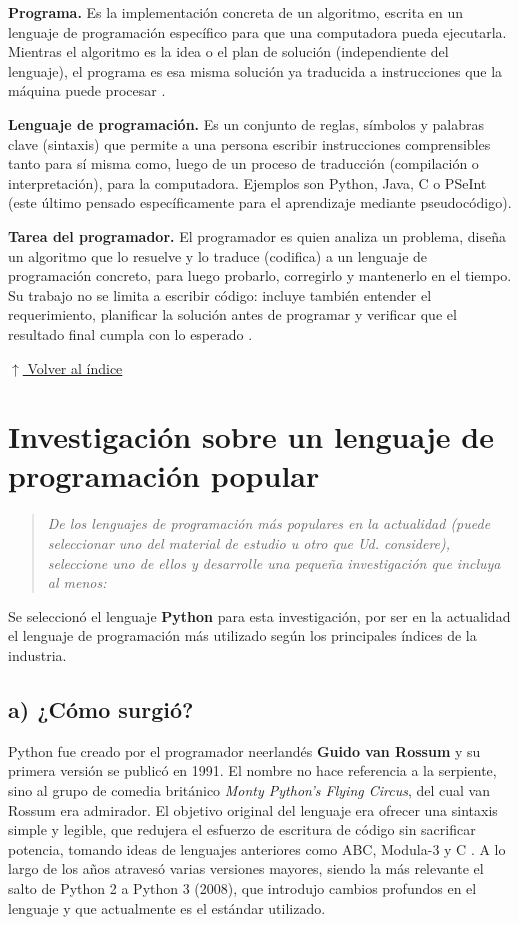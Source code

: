 \documentclass[12pt]{article}
\newcommand{\volverindice}{%
    \vspace{1em}%
    \begin{flushright}%
        \hyperlink{indice}{\small $\uparrow$ Volver al índice}%
    \end{flushright}%
}
\newcommand{\enunciado}[1]{%
    \begin{quote}
        \itshape #1
    \end{quote}
}
\begin{document}
\textbf{Programa.} Es la implementación concreta de un algoritmo, escrita en un lenguaje de programación específico para que una computadora pueda ejecutarla. Mientras el algoritmo es la idea o el plan de solución (independiente del lenguaje), el programa es esa misma solución ya traducida a instrucciones que la máquina puede procesar \parencite{joyanes2008fundamentos}.

\textbf{Lenguaje de programación.} Es un conjunto de reglas, símbolos y palabras clave (sintaxis) que permite a una persona escribir instrucciones comprensibles tanto para sí misma como, luego de un proceso de traducción (compilación o interpretación), para la computadora. Ejemplos son Python, Java, C o PSeInt (este último pensado específicamente para el aprendizaje mediante pseudocódigo).

\textbf{Tarea del programador.} El programador es quien analiza un problema, diseña un algoritmo que lo resuelve y lo traduce (codifica) a un lenguaje de programación concreto, para luego probarlo, corregirlo y mantenerlo en el tiempo. Su trabajo no se limita a escribir código: incluye también entender el requerimiento, planificar la solución antes de programar y verificar que el resultado final cumpla con lo esperado \parencite{cairo2005metodologia}.

\volverindice
\newpage


\section{Investigación sobre un lenguaje de programación popular}

\enunciado{De los lenguajes de programación más populares en la actualidad (puede seleccionar uno del material de estudio u otro que Ud. considere), seleccione uno de ellos y desarrolle una pequeña investigación que incluya al menos:}

Se seleccionó el lenguaje \textbf{Python} para esta investigación, por ser en la actualidad el lenguaje de programación más utilizado según los principales índices de la industria.

\subsection*{a) ¿Cómo surgió?}

Python fue creado por el programador neerlandés \textbf{Guido van Rossum} y su primera versión se publicó en 1991. El nombre no hace referencia a la serpiente, sino al grupo de comedia británico \emph{Monty Python's Flying Circus}, del cual van Rossum era admirador. El objetivo original del lenguaje era ofrecer una sintaxis simple y legible, que redujera el esfuerzo de escritura de código sin sacrificar potencia, tomando ideas de lenguajes anteriores como ABC, Modula-3 y C \parencite{joyanes2008fundamentos}. A lo largo de los años atravesó varias versiones mayores, siendo la más relevante el salto de Python 2 a Python 3 (2008), que introdujo cambios profundos en el lenguaje y que actualmente es el estándar utilizado.
\end{document}
